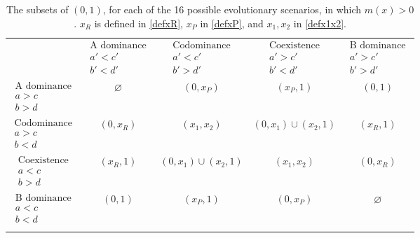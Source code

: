 \documentclass[12pt]{article}
\theoremstyle{definition}
\begin{document}
\begin{table}     
	\begin{tabular}{ccccc}
		\hline\noalign{\smallskip}
		&$\begin{array}{c}
			\textrm{A dominance}\\
			a'<c'\\
			b'<d'
		\end{array}$&$\begin{array}{c}
			\textrm{Codominance}\\
			a'<c'\\
			b'>d'
		\end{array}$ &$\begin{array}{c}
			\textrm{Coexistence}\\
			a'>c'\\
			b'<d'
		\end{array}$ & $\begin{array}{c}
			\textrm{B dominance}\\
			a'>c'\\
			b'>d'
		\end{array}$ \\
		
		\noalign{\smallskip}\hline\noalign{\smallskip}
		$\begin{array}{c}
			\textrm{A dominance}\\
			a>c\\
			b>d
		\end{array}$ &$\varnothing$&$(0,x_P)$&$(x_P,1)$&$(0,1)$ \\
		\noalign{\smallskip}\hline
		$\begin{array}{c}
			\textrm{Codominance}\\
			a>c\\
			b<d
		\end{array}$ &$(0,x_R)$&$(x_1,x_2)$&$(0,x_1)\cup (x_2,1)$&$(x_R,1)$ \\
		\noalign{\smallskip}\hline
		$\begin{array}{c}
			\textrm{Coexistence}\\
			a<c\\
			b>d
		\end{array}$ &$(x_R,1)$&$(0,x_1)\cup (x_2,1)$&$(x_1,x_2)$&$(0,x_R)$ \\
		\noalign{\smallskip}\hline
		$\begin{array}{c}
			\textrm{B dominance}\\
			a<c\\
			b<d
		\end{array}$ &$(0,1)$&$(x_P,1)$&$(0,x_P)$&$\varnothing$ \\
		\noalign{\smallskip}\hline \smallskip
	\end{tabular}
	\caption{\label{tab:posm} The subsets of $(0,1)$, for each of the 16 possible evolutionary scenarios, in which $m(x)>0$. $x_R$ is defined in \eqref{defxR}, $x_P$ in \eqref{defxP}, and $x_1,x_2$ in \eqref{defx1x2}.}
\end{table}
\end{document}
